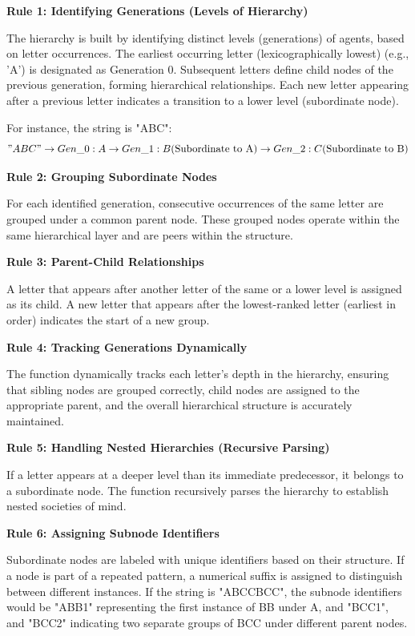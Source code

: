 \textbf{Rule 1: Identifying Generations (Levels of Hierarchy)}

The hierarchy is built by identifying distinct levels (generations) of agents, based on letter occurrences. The earliest occurring letter (lexicographically lowest) (e.g., 'A') is designated as Generation 0. Subsequent letters define child nodes of the previous generation, forming hierarchical relationships. Each new letter appearing after a previous letter indicates a transition to a lower level (subordinate node). 

For instance, the string is "ABC": $$"ABC" \rightarrow Gen\_0:A \rightarrow Gen\_1:B \text{(Subordinate to A)} \rightarrow Gen\_2:C \text{(Subordinate to B)}$$

\textbf{Rule 2: Grouping Subordinate Nodes}

For each identified generation, consecutive occurrences of the same letter are grouped under a common parent node. These grouped nodes operate within the same hierarchical layer and are peers within the structure.

\textbf{Rule 3: Parent-Child Relationships}

A letter that appears after another letter of the same or a lower level is assigned as its child. A new letter that appears after the lowest-ranked letter (earliest in order) indicates the start of a new group.

\textbf{Rule 4: Tracking Generations Dynamically}

The function dynamically tracks each letter’s depth in the hierarchy, ensuring that sibling nodes are grouped correctly, child nodes are assigned to the appropriate parent, and the overall hierarchical structure is accurately maintained.

\textbf{Rule 5: Handling Nested Hierarchies (Recursive Parsing)}

If a letter appears at a deeper level than its immediate predecessor, it belongs to a subordinate node. The function recursively parses the hierarchy to establish nested societies of mind.

\textbf{Rule 6: Assigning Subnode Identifiers}

Subordinate nodes are labeled with unique identifiers based on their structure. If a node is part of a repeated pattern, a numerical suffix is assigned to distinguish between different instances. If the string is "ABCCBCC", the subnode identifiers would be "ABB1" representing the first instance of BB under A, and "BCC1", and "BCC2" indicating two separate groups of BCC under different parent nodes.

